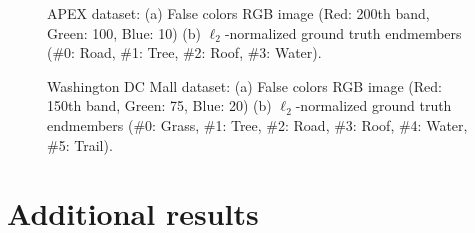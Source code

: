   \begin{figure}[h]
    \centering
    \hfil
    \caption{APEX dataset: (a) False colors RGB image (Red: 200th band, Green: 100, Blue: 10) (b)
    $\ell_2$-normalized ground truth endmembers (\#0: Road, \#1: Tree, \#2: Roof,
    \#3: Water).}
    \label{fig:apex}
  \end{figure}

  \begin{figure}[h]
    \centering
    \hfil
    \caption{Washington DC Mall dataset: (a) False colors RGB image (Red: 150th band, Green: 75,
    Blue: 20) (b) $\ell_2$-normalized ground truth endmembers (\#0: Grass, \#1:
    Tree, \#2: Road, \#3: Roof, \#4: Water, \#5: Trail).}
    \label{fig:wdc}
  \end{figure}

\section{Additional results}

